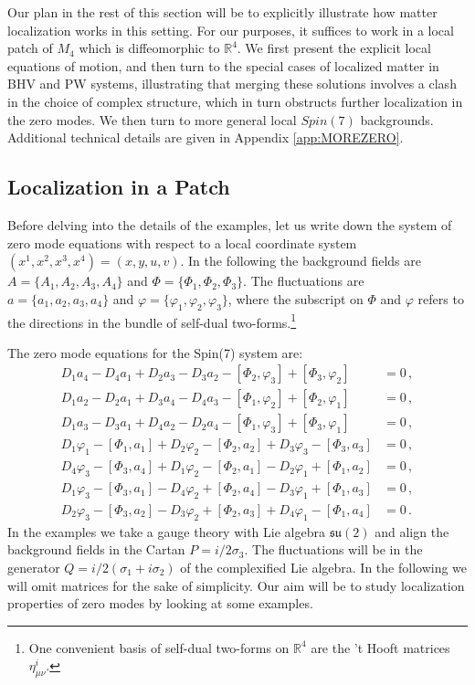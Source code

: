 \documentclass[12pt]{article}%
\numberwithin{equation}{section}
\newcommand{\al}[1]{\begin{align}#1\end{align}}
\renewcommand{\(}{\left(}
\renewcommand{\)}{\right)}
\renewcommand{\[}{\left[}
\renewcommand{\]}{\right]}
\begin{document}
Our plan in the rest of this section will be to explicitly illustrate how matter localization works in this setting. For our purposes, it suffices to work in a local patch of $M_4$ which is diffeomorphic to $\mathbb{R}^4$. We first present the explicit local equations of motion, and then turn to the special cases of localized matter in BHV and PW systems, illustrating that merging these solutions involves a clash in the choice of complex structure, which in turn obstructs further localization in the zero modes. We then turn to more general local $Spin(7)$ backgrounds.
Additional technical details are given in Appendix \ref{app:MOREZERO}.

\subsection{Localization in a Patch}

Before delving into the details of the examples, let us write down the system of zero mode equations with respect to a local coordinate system
$(x^1, x^2, x^3, x^4) = (x,y,u,v)$. In the following the background fields are $A = \{A_1,A_2,A_3,A_4\}$ and $\Phi = \{\Phi_1,\Phi_2,\Phi_3\}$. The fluctuations are $a = \{a_1,a_2,a_3,a_4\}$ and $\varphi = \{\varphi_1,\varphi_2,\varphi_3\}$, where the subscript on $\Phi$ and $\varphi$ refers to the directions in the bundle of self-dual two-forms.\footnote{One convenient basis of self-dual two-forms on $\mathbb{R}^4$ are the 't Hooft matrices $\eta^{i}_{\mu \nu}$.}

The zero mode equations for the Spin(7) system are:
%
\al{D_1 a_4 - D_4 a_1 +D_2 a_3 - D_3 a_2 -[\Phi_2,\varphi_3]+[\Phi_3,\varphi_2]&=0\,,\\
D_1 a_2 - D_2 a_1 + D_3 a_4 - D_4 a_3 -[\Phi_1,\varphi_2]+[\Phi_2,\varphi_1]&=0\,,\\
D_1 a_3 - D_3 a_1 + D_4 a_2 - D_2 a_4 -[\Phi_1,\varphi_3]+[\Phi_3,\varphi_1]&=0\,,\\
D_1 \varphi_1 - [\Phi_1,a_1] + D_2 \varphi_2 - [\Phi_2,a_2] +D_3 \varphi_3 -[\Phi_3,a_3]&=0\,,\\
D_4 \varphi_3 -[\Phi_3,a_4] + D_1 \varphi_2 - [\Phi_2,a_1]-D_2 \varphi_1 +[\Phi_1,a_2]&=0\,,\\
D_1 \varphi_3 -[\Phi_3,a_1]-D_4 \varphi_2+[\Phi_2,a_4]-D_3 \varphi_1+[\Phi_1,a_3]&=0\,,\\
D_2 \varphi_3-[\Phi_3,a_2]-D_3 \varphi_2 + [\Phi_2,a_3]+D_4 \varphi_1-[\Phi_1,a_4]&=0\,.
}
%
In the examples we take a gauge theory with Lie algebra $\mathfrak{su}(2)$ and align the background fields in the Cartan $P = i/2 \sigma_3$. The fluctuations will be in the generator $Q = i/2 (\sigma_1 + i \sigma_2)$ of the complexified Lie algebra. In the following we will omit matrices for the sake of simplicity. Our aim will be to study localization properties of zero modes by looking at some examples.
\end{document}
